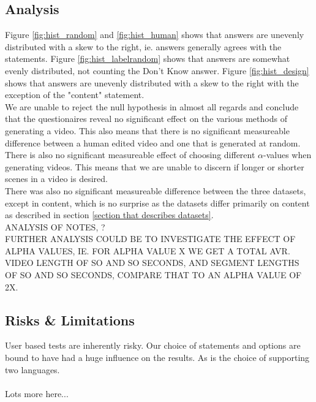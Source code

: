 \subsection{Analysis}
%
Figure \ref{fig:hist_random} and \ref{fig:hist_human} shows that answers are unevenly distributed with a skew to the right, ie. answers generally agrees with the statements. Figure \ref{fig:hist_labelrandom} shows that answers are somewhat evenly distributed, not counting the Don't Know answer. Figure \ref{fig:hist_design} shows that answers are unevenly distributed with a skew to the right with the exception of the "content" statement.\\
We are unable to reject the null hypothesis in almost all regards and conclude that the questionaires reveal no significant effect on the various methods of generating a video. This also means that there is no significant measureable difference between a human edited video and one that is generated at random.\\
%
There is also no significant measureable effect of choosing different $\alpha$-values when generating videos. This means that we are unable to discern if longer or shorter scenes in a video is desired.\\
%
There was also no significant measureable difference between the three datasets, except in content, which is no surprise as the datasets differ primarily on content as described in section \ref{section that describes datasets}.\\
%
ANALYSIS OF NOTES, ?\\
%
FURTHER ANALYSIS COULD BE TO INVESTIGATE THE EFFECT OF ALPHA VALUES, IE. FOR ALPHA VALUE X WE GET A TOTAL AVR. VIDEO LENGTH OF SO AND SO SECONDS, AND SEGMENT LENGTHS OF SO AND SO SECONDS, COMPARE THAT TO AN ALPHA VALUE OF 2X.\\
%
\subsection{Risks \& Limitations}
%
User based tests are inherently risky. Our choice of statements and options are bound to have had a huge influence on the results. As is the choice of supporting two languages.\\\\
%
Lots more here...
%
